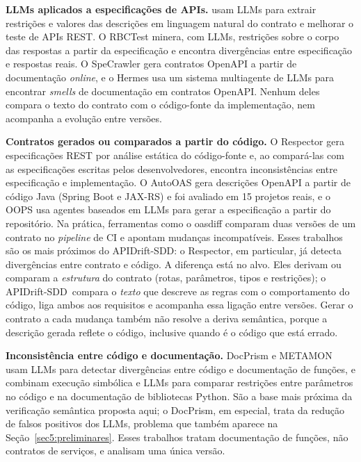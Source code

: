 \documentclass[12pt]{article}
\newcommand{\proj}{APIDrift-SDD}
\begin{document}
\textbf{LLMs aplicados a especificações de APIs.} \cite{kim2024llmrest} usam LLMs para extrair restrições e valores das descrições em linguagem natural do contrato e melhorar o teste de APIs REST. O RBCTest \cite{huynh2026rbctest} minera, com LLMs, restrições sobre o corpo das respostas a partir da especificação e encontra divergências entre especificação e respostas reais. O SpeCrawler \cite{lazar2024specrawler} gera contratos OpenAPI a partir de documentação \textit{online}, e o Hermes \cite{lima2026hermes} usa um sistema multiagente de LLMs para encontrar \textit{smells} de documentação em contratos OpenAPI. Nenhum deles compara o texto do contrato com o código-fonte da implementação, nem acompanha a evolução entre versões.

\textbf{Contratos gerados ou comparados a partir do código.} O Respector \cite{huang2024respector} gera especificações REST por análise estática do código-fonte e, ao compará-las com as especificações escritas pelos desenvolvedores, encontra inconsistências entre especificação e implementação. O AutoOAS \cite{lercher2024autooas} gera descrições OpenAPI a partir de código Java (Spring Boot e JAX-RS) e foi avaliado em 15 projetos reais, e o OOPS \cite{chen2026oops} usa agentes baseados em LLMs para gerar a especificação a partir do repositório. Na prática, ferramentas como o oasdiff \cite{oasdiff} comparam duas versões de um contrato no \textit{pipeline} de CI e apontam mudanças incompatíveis. Esses trabalhos são os mais próximos do \proj: o Respector, em particular, já detecta divergências entre contrato e código. A diferença está no alvo. Eles derivam ou comparam a \textit{estrutura} do contrato (rotas, parâmetros, tipos e restrições); o \proj\ compara o \textit{texto} que descreve as regras com o comportamento do código, liga ambos aos requisitos e acompanha essa ligação entre versões. Gerar o contrato a cada mudança também não resolve a deriva semântica, porque a descrição gerada reflete o código, inclusive quando é o código que está errado.

\textbf{Inconsistência entre código e documentação.} DocPrism \cite{xu2025docprism} e METAMON \cite{lee2025metamon} usam LLMs para detectar divergências entre código e documentação de funções, e \cite{xu2025mpc} combinam execução simbólica e LLMs para comparar restrições entre parâmetros no código e na documentação de bibliotecas Python. São a base mais próxima da verificação semântica proposta aqui; o DocPrism, em especial, trata da redução de falsos positivos dos LLMs, problema que também aparece na Seção~\ref{sec5:preliminares}. Esses trabalhos tratam documentação de funções, não contratos de serviços, e analisam uma única versão.
\end{document}
